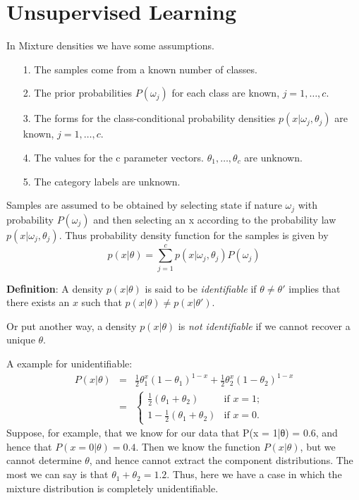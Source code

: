 \documentclass[slidestop,compress,mathserif]{beamer}
\begin{document}
	\section{Unsupervised Learning}
	\begin{frame}
		In Mixture densities we have some assumptions.
		\begin{itemize}
			\item[1.] The samples come from a known number of classes.
			\item[2.] The prior probabilities $P(\omega_j)$ for each class are known, $j=1,\ldots,c$.
			\item[3.] The forms for the class-conditional probability densities $p(x|\omega_j,\theta_j)$ are known, $j=1,\ldots,c$.
			\item[4.] The values for the c parameter vectors. $\theta_1,\ldots,\theta_c$ are unknown.
			\item[5.] The category labels are unknown.
		\end{itemize}
		Samples are assumed to be obtained by selecting state if nature $\omega_j$ with probability $P(\omega_j)$ and then selecting an x according to the probability law $p(x|\omega_j,\theta_j)$. Thus probability density function for the samples is given by
		$$p(x|\theta)=\sum_{j=1}^{c}p(x|\omega_j,\theta_j)P(\omega_j)$$
	\end{frame}
	\begin{frame}
		\textbf{Definition}: A density $p(x|\theta)$ is said to be \textit{identifiable} if $\theta \neq \theta'$ implies that there exists an $x$ such that $p(x|\theta) \neq p(x|\theta')$. 
		
		Or put another way, a density $p(x|\theta)$ is \textit{not identifiable} if we cannot recover a unique $\theta$.
		
		A example for unidentifiable:
		\begin{eqnarray*}
			P(x|\theta) &=& \frac{1}{2}\theta_1^x(1-\theta_1)^{1-x}+\frac{1}{2}\theta_2^x(1-\theta_2)^{1-x}\\
			&=& \left\{\begin{array}{ll}
				\frac{1}{2}(\theta_1+\theta_2) & \mbox{if $x=1$;}\\
				1-\frac{1}{2}(\theta_1+\theta_2) & 	\mbox{if $x=0$.}
			\end{array}
			\right.
		\end{eqnarray*}
		Suppose, for example, that we know for our data that P(x = 1|θ) = 0.6, and hence that $P(x=0|\theta)=0.4$. Then we know the function $P(x|\theta)$, but we cannot determine $\theta$, and hence cannot extract the component distributions. The most we can say is that $\theta_1+\theta_2=1.2$. Thus, here we have a case in which the mixture distribution is completely unidentifiable.
	\end{frame}
\end{document}
